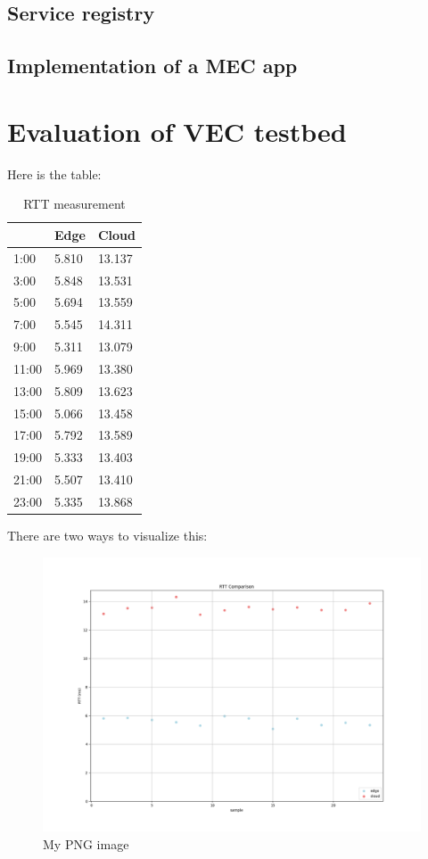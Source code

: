 \documentclass[12pt,a4paper,twoside]{report}
\begin{document}
\subsection{Service registry}
\subsection{Implementation of a MEC app}

\section{Evaluation of VEC testbed}
Here is the table:
\begin{table}[!ht]
	\caption{RTT measurement}
    \centering
    \begin{tabular}{|l|l|l|}
    \hline
        & \textbf{Edge} & \textbf{Cloud} \\ \hline
        1:00 & 5.810 & 13.137 \\ \hline
        3:00 & 5.848 & 13.531 \\ \hline
        5:00 & 5.694 & 13.559 \\ \hline
        7:00 & 5.545 & 14.311 \\ \hline
        9:00 & 5.311 & 13.079 \\ \hline
        11:00 & 5.969 & 13.380 \\ \hline
        13:00 & 5.809 & 13.623 \\ \hline
        15:00 & 5.066 & 13.458 \\ \hline
        17:00 & 5.792 & 13.589 \\ \hline
        19:00 & 5.333 & 13.403 \\ \hline
        21:00 & 5.507 & 13.410 \\ \hline
        23:00 & 5.335 & 13.868 \\ \hline
    \end{tabular}
\end{table}
There are two ways to visualize this:
\begin{figure}[ht]
	\centering
	\includegraphics[width=13cm]{./images/RTT-comparison.png} 
	\caption{My PNG image}
\end{figure}
\end{document}
